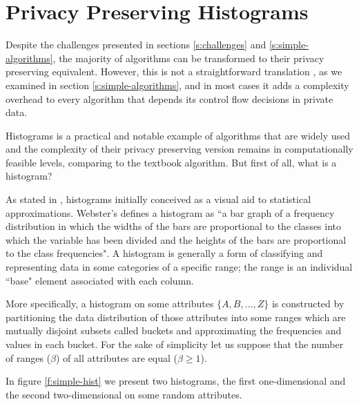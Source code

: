 \section{Privacy Preserving Histograms}\label{s:histograms}
Despite the challenges presented in sections \ref{s:challenges} and \ref{s:simple-algorithms}, the majority of algorithms can be transformed to their privacy preserving equivalent.
However, this is not a straightforward translation , as we examined in section \ref{s:simple-algorithms}, and in most cases it adds a complexity overhead to every algorithm that depends its control flow decisions in private data.

Histograms is a practical and notable example of algorithms that are widely used and the complexity of their privacy preserving version remains in computationally feasible levels, comparing to the textbook algorithm.
But first of all, what is a histogram?

As stated in \cite{ioannidis2003history}, histograms initially conceived as a visual aid to statistical approximations.
Webster’s defines a histogram as ``a bar graph of a frequency distribution in which the widths of the bars are proportional to the classes into which the variable has been divided and the heights of the bars are proportional to the class frequencies".
A histogram is generally a form of classifying and representing data in some categories of a specific range; the range is an individual ``base" element associated with each column.

More specifically, a histogram on some attributes $\{A, B, \dots, Z\}$ is constructed by partitioning the data distribution of those attributes into some ranges which are mutually disjoint subsets called buckets and approximating the frequencies and values in each bucket.
For the sake of simplicity let us suppose that the number of ranges ($\beta$) of all attributes are equal ($\beta \geq 1$).

In figure \ref{f:simple-hist} we present two histograms, the first one-dimensional and the second two-dimensional on some random attributes.


